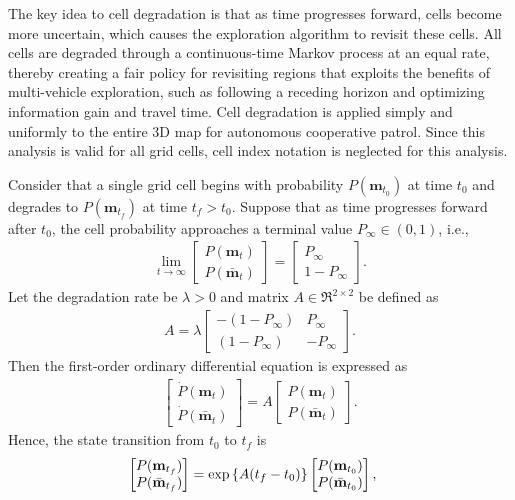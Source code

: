 The key idea to cell degradation is that as time progresses forward, cells become more uncertain, which causes the exploration algorithm to revisit these cells. All cells are degraded through a continuous-time Markov process at an equal rate, thereby creating a fair policy for revisiting regions that exploits the benefits of multi-vehicle exploration, such as following a receding horizon and optimizing information gain and travel time. Cell degradation is applied simply and uniformly to the entire 3D map for autonomous cooperative patrol. Since this analysis is valid for all grid cells, cell index notation is neglected for this analysis.

Consider that a single grid cell begins with probability $P(\mathbf{m}_{t_0})$ at time $t_0$ and degrades to $P(\mathbf{m}_{t_f})$ at time $t_f>t_0$. Suppose that as time progresses forward after $t_0$, the cell probability approaches a terminal value $P_\infty\in(0,1)$, i.e.,
\begin{align}
\label{eqn:DegradationQualification}
\lim_{t\rightarrow\infty}\begin{bmatrix}
P(\mathbf{m}_{t})
\\
P(\bar{\mathbf{m}}_{t})
\end{bmatrix}
=
\begin{bmatrix}
P_\infty
\\
1-P_\infty
\end{bmatrix}.
\end{align}
Let the degradation rate be $\lambda>0$ and matrix $A\in\Re^{2\times2}$ be defined as
\begin{align}
A=\lambda
\begin{bmatrix}
-(1-P_\infty) & P_\infty
\\
(1-P_\infty) & -P_\infty
\end{bmatrix}.
\end{align}
Then the first-order ordinary differential equation is expressed as
\begin{align}
\begin{bmatrix}
\dot{P}(\mathbf{m}_{t})
\\
\dot{P}(\bar{\mathbf{m}}_{t})
\end{bmatrix}
=
A
\begin{bmatrix}
P(\mathbf{m}_{t})
\\
P(\bar{\mathbf{m}}_{t})
\end{bmatrix}.
\end{align}
Hence, the state transition from $t_0$ to $t_f$ is
\begin{align}
\label{eqn:DegradeStateTransition}
\begin{bmatrix}
P(\mathbf{m}_{t_f})
\\
P(\bar{\mathbf{m}}_{t_f})
\end{bmatrix}
&=
\exp\left\{ A(t_f-t_0) \right\}
\begin{bmatrix}
P(\mathbf{m}_{t_0})
\\
P(\bar{\mathbf{m}}_{t_0})
\end{bmatrix},
\end{align}
